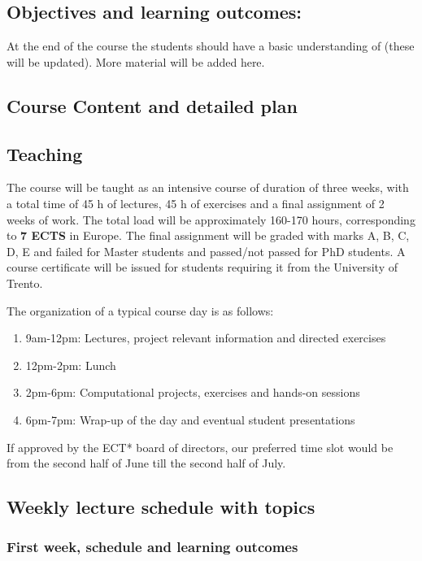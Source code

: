 \documentclass[superscriptaddress,amsmath,amssymb,aps,floatfix]{revtex4-2}
\begin{document}
\subsection{Objectives and learning outcomes:}

At the end of the course the students should have a basic
understanding of (these will be updated). More material will be added
here.

\subsection{Course Content and detailed plan}

\subsection{Teaching}\label{teaching}

The course will be taught as an intensive course of duration of three
weeks, with a total time of 45 h of lectures, 45 h of exercises and a
final assignment of 2 weeks of work. The total load will be
approximately 160-170 hours, corresponding to \textbf{7 ECTS} in
Europe.  The final assignment will be graded with marks A, B, C, D, E
and failed for Master students and passed/not passed for PhD
students. A course certificate will be issued for students requiring
it from the University of Trento.

The organization of a typical course day is as follows:

\begin{enumerate}
\def\labelenumi{\arabic{enumi}.}
\item
  9am-12pm: Lectures, project relevant information and directed
  exercises
\item
  12pm-2pm: Lunch
\item
  2pm-6pm: Computational projects, exercises and hands-on sessions
\item
  6pm-7pm: Wrap-up of the day and eventual student presentations
\end{enumerate}

If approved by the ECT* board of directors, our preferred time slot
would be from the second half of June till the second half of July.


\subsection{Weekly lecture schedule with topics}

\subsubsection{First week, schedule and learning outcomes}
\end{document}
